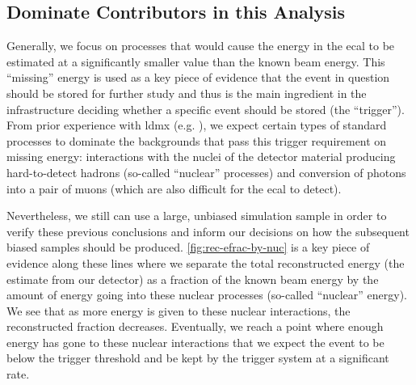 \subsection{Dominate Contributors in this Analysis}
Generally, we focus on processes that would cause the energy in the \ac{ecal} to be
estimated at a significantly smaller value than the known beam energy.
This ``missing'' energy is used as a key piece of evidence that the event in question
should be stored for further study and thus is the main ingredient in the infrastructure
deciding whether a specific event should be stored (the ``trigger'').
From prior experience with \ac{ldmx} (e.g. \cite{ldmx-whitepaper,ldmx-photon-reject-2020}),
we expect certain types of standard processes to dominate the backgrounds that pass this
trigger requirement on missing energy: interactions with the nuclei of the detector
material producing hard-to-detect hadrons (so-called ``nuclear'' processes) and conversion
of photons into a pair of muons (which are also difficult for the \ac{ecal} to detect).

Nevertheless, we still can use a large, unbiased simulation sample in order to verify
these previous conclusions and inform our decisions on how the subsequent biased samples
should be produced.
\cref{fig:rec-efrac-by-nuc} is a key piece of evidence along these lines
where we separate the total reconstructed energy (the estimate from our detector)
as a fraction of the known beam energy by the amount of energy going into these nuclear
processes (so-called ``nuclear'' energy).
We see that as more energy is given to these nuclear interactions,
the reconstructed fraction decreases.
Eventually, we reach a point where enough energy has gone to these nuclear interactions
that we expect the event to be below the trigger threshold and be kept by the trigger
system at a significant rate.


